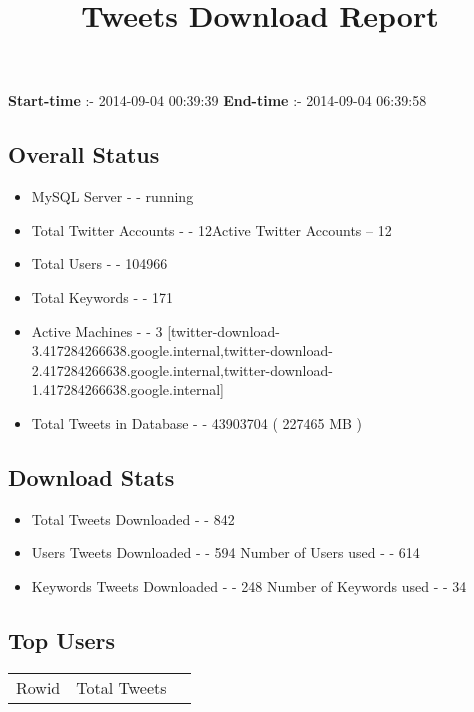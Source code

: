 \documentclass{article}\usepackage[T1]{fontenc}
\begin{document}
\title{\textbf{Tweets Download Report}}
               \date{}
                \maketitle
               \centerline{\textbf{Start-time} :- 2014-09-04 00:39:39 \hspace{40pt} \textbf{End-time} :- 2014-09-04 06:39:58}               \subsection*{Overall Status}                \begin{itemize}                \item MySQL Server - - running               \item Total Twitter Accounts - - 12\newline Active Twitter Accounts -- 12               \item Total Users - - 104966               \item Total Keywords - - 171               \item Active Machines - - 3 [twitter-download-3.417284266638.google.internal,twitter-download-2.417284266638.google.internal,twitter-download-1.417284266638.google.internal]               \item Total Tweets in Database - - 43903704 ( 227465 MB )               \end{itemize}               \subsection*{Download Stats}                \begin{itemize}                \item Total Tweets Downloaded - - 842               \item Users Tweets Downloaded - - 594 \newline Number of Users used - - 614               \item Keywords Tweets Downloaded - - 248 \newline Number of Keywords used - - 34              \end{itemize}              \subsection*{Top Users}\begin{tabular}{|c|c|c|}         \hline         Rowid & Total Tweets \\ 

\end{tabular}
\end{document}
